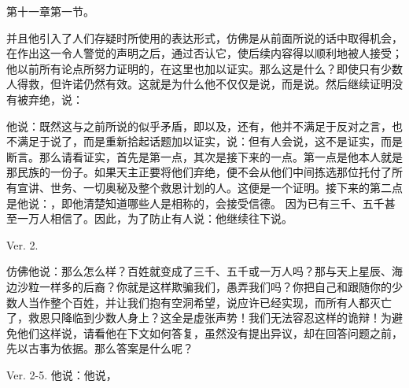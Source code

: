 第十一章第一节。\par

并且他引入了人们存疑时所使用的表达形式，仿佛是从前面所说的话中取得机会，在作出这一令人警觉的声明之后，通过否认它，使后续内容得以顺利地被人接受；他以前所有论点所努力证明的，在这里也加以证实。那么这是什么？即使只有少数人得救，但许诺仍然有效。这就是为什么他不仅仅是说，而是说。然后继续证明没有被弃绝，说：\par

他说：既然这与之前所说的似乎矛盾，即以及，还有，他并不满足于反对之言，也不满足于说了，而是重新拾起话题加以证实，说：但有人会说，这不是证实，而是断言。那么请看证实，首先是第一点，其次是接下来的一点。第一点是他本人就是那民族的一份子。如果天主正要将他们弃绝，便不会从他们中间拣选那位托付了所有宣讲、世务、一切奥秘及整个救恩计划的人。这便是一个证明。接下来的第二点是他说：，即他清楚知道哪些人是相称的，会接受信德。 因为已有三千、五千甚至一万人相信了。因此，为了防止有人说：他继续往下说。\par

Ver. 2. \par

仿佛他说：那么怎么样？百姓就变成了三千、五千或一万人吗？那与天上星辰、海边沙粒一样多的后裔？你就是这样欺骗我们，愚弄我们吗？你把自己和跟随你的少数人当作整个百姓，并让我们抱有空洞希望，说应许已经实现，而所有人都灭亡了，救恩只降临到少数人身上？这全是虚张声势！我们无法容忍这样的诡辩！为避免他们这样说，请看他在下文如何答复，虽然没有提出异议，却在回答问题之前，先以古事为依据。那么答案是什么呢？\par

Ver. 2-5. 他说：他说，\par

